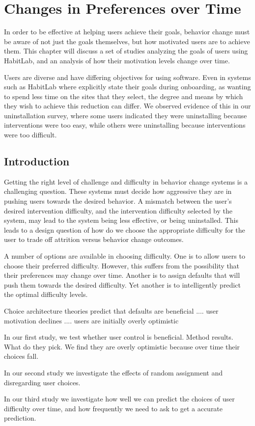 \chapter{Changes in Preferences over Time}

In order to be effective at helping users achieve their goals, behavior change must be aware of not just the goals themselves, but how motivated users are to achieve them. This chapter will discuss a set of studies analyzing the goals of users using HabitLab, and an analysis of how their motivation levels change over time.

Users are diverse and have differing objectives for using software. Even in systems such as HabitLab where explicitly state their goals during onboarding, as wanting to spend less time on the sites that they select, the degree and means by which they wish to achieve this reduction can differ. We observed evidence of this in our uninstallation survey, where some users indicated they were uninstalling because interventions were too easy, while others were uninstalling because interventions were too difficult.


\section{Introduction}

Getting the right level of challenge and difficulty in behavior change systems is a challenging question. These systems must decide how aggressive they are in pushing users towards the desired behavior. A mismatch between the user's desired intervention difficulty, and the intervention difficulty selected by the system, may lead to the system being less effective, or being uninstalled. This leads to a design question of how do we choose the appropriate difficulty for the user to trade off attrition versus behavior change outcomes.

A number of options are available in choosing difficulty. One is to allow users to choose their preferred difficulty. However, this suffers from the possibility that their preferences may change over time. Another is to assign defaults that will push them towards the desired difficulty. Yet another is to intelligently predict the optimal difficulty levels.

Choice architecture theories predict that defaults are beneficial .... user motivation declines .... users are initially overly optimistic

In our first study, we test whether user control is beneficial. Method results. What do they pick. We find they are overly optimistic because over time their choices fall.

In our second study we investigate the effects of random assignment and disregarding user choices.

In our third study we investigate how well we can predict the choices of user difficulty over time, and how frequently we need to ask to get a accurate prediction.